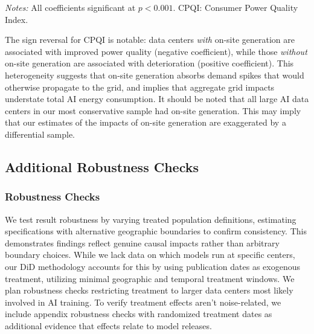 \documentclass[a4paper,fleqn,longmktitle]{cas-sc}
\newcommand{\nb}[1]{\textcolor{blue}{NB[#1]}}
\begin{document}
\begin{table}[h]
\centering
\caption{Power Quality Effects by On-site Generation Status}
\label{tab:btm_effects}
\begin{flushleft}
\footnotesize\textit{Notes:} All coefficients significant at $p < 0.001$. CPQI: Consumer Power Quality Index.
\end{flushleft}
\end{table}

The sign reversal for CPQI is notable: data centers \textit{with} on-site generation are associated with improved power quality (negative coefficient), while those \textit{without} on-site generation are associated with deterioration (positive coefficient). This heterogeneity suggests that on-site generation absorbs demand spikes that would otherwise propagate to the grid, and implies that aggregate grid impacts understate total AI energy consumption. It should be noted that all large AI data centers in our most conservative sample had on-site generation. This may imply that our estimates of the impacts of on-site generation are exaggerated by a differential sample.



\subsection{Additional Robustness Checks}\label{App:AdditionalRobustnessChecks}


\subsubsection{Robustness Checks}
We test result robustness by varying treated population definitions, estimating specifications with alternative geographic boundaries to confirm consistency. This demonstrates findings reflect genuine causal impacts rather than arbitrary boundary choices. While we lack data on which models run at specific centers, our DiD methodology accounts for this by using publication dates as exogenous treatment, utilizing minimal geographic and temporal treatment windows. We plan robustness checks restricting treatment to larger data centers most likely involved in AI training. To verify treatment effects aren't noise-related, we include appendix robustness checks with randomized treatment dates as additional evidence that effects relate to model releases.
\end{document}
